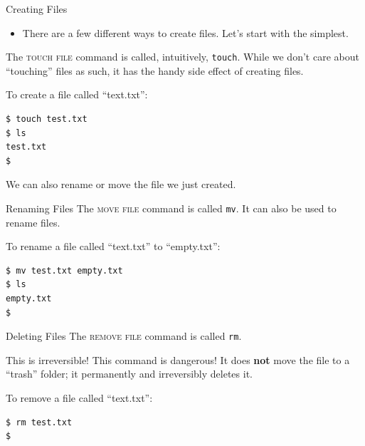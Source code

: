 \begin{frame}[fragile]{Creating Files}
  \begin{itemize}
    \item
      There are a few different ways to create files.  Let's start with the
      simplest.
  \end{itemize}
  \pause
  \alert<2>{The \textsc{touch file} command is called, intuitively,
  \texttt{touch}.}  While we don't care about \enquote{touching} files as such,
  it has the handy side effect of creating files.
  \pause
  \begin{example}[touch]
    To create a file called \enquote{text.txt}:
    \begin{verbatim}
$ touch test.txt
$ ls
test.txt
$
    \end{verbatim}
  \end{example}
\end{frame}

We can also rename or move the file we just created.

\begin{frame}[fragile]{Renaming Files}
  \alert<1>{The \textsc{move file} command is called \texttt{mv}.}  It can also
  be used to rename files.  \pause
  \begin{example}[mv]
    To rename a file called \enquote{text.txt} to \enquote{empty.txt}:
    \begin{verbatim}
$ mv test.txt empty.txt
$ ls
empty.txt
$
    \end{verbatim}
  \end{example}
\end{frame}

\begin{frame}[fragile]{Deleting Files}
  \alert<1>{The \textsc{remove file} command is called \texttt{rm}.}
  \begin{alertblock}{This is irreversible!}
    This command is dangerous!  It does \textbf{not} move the file to a
    \enquote{trash} folder; it permanently and irreversibly deletes it.
  \end{alertblock}\pause
  \begin{example}[rm]
    To remove a file called \enquote{text.txt}:
    \begin{verbatim}
$ rm test.txt
$
    \end{verbatim}
  \end{example}
\end{frame}

